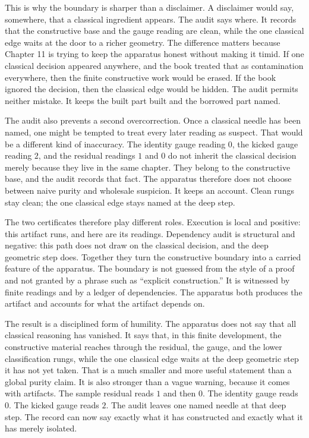 This is why the boundary is sharper than a disclaimer. A disclaimer would say,
somewhere, that a classical ingredient appears. The audit says where. It records
that the constructive base and the gauge reading are clean, while the one classical
edge waits at the door to a richer geometry. The difference matters because Chapter 11 is trying to keep the
apparatus honest without making it timid. If one classical decision appeared
anywhere, and the book treated that as contamination everywhere, then the
finite constructive work would be erased. If the book ignored the decision,
then the classical edge would be hidden. The audit permits neither mistake. It
keeps the built part built and the borrowed part named.

The audit also prevents a second overcorrection. Once a classical needle has
been named, one might be tempted to treat every later reading as suspect. That
would be a different kind of inaccuracy. The identity gauge reading \(0\), the
kicked gauge reading \(2\), and the residual readings \(1\) and \(0\) do not
inherit the classical decision merely because they live in the same chapter. They
belong to the constructive base, and the audit records that fact. The apparatus
therefore does not choose between naive purity and wholesale suspicion. It keeps
an account. Clean rungs stay clean; the one classical edge stays named at the deep
step.

The two certificates therefore play different roles. Execution is local and
positive: this artifact runs, and here are its readings. Dependency audit is
structural and negative: this path does not draw on the classical decision, and
the deep geometric step does. Together they turn the constructive boundary into a carried
feature of the apparatus. The boundary is not guessed from the style of a proof
and not granted by a phrase such as ``explicit construction.'' It is witnessed by
finite readings and by a ledger of dependencies. The apparatus both produces
the artifact and accounts for what the artifact depends on.

The result is a disciplined form of humility. The apparatus does not say that
all classical reasoning has vanished. It says that, in this finite development,
the constructive material reaches through the residual, the gauge, and the
lower classification rungs, while the one classical edge waits at the deep
geometric step it has not yet taken. That
is a much smaller and more useful statement than a global purity claim. It is
also stronger than a vague warning, because it comes with artifacts. The sample
residual reads \(1\) and then \(0\). The identity gauge reads \(0\). The kicked
gauge reads \(2\). The audit leaves one named needle at that deep step. The record can
now say exactly what it has constructed and exactly what it has merely isolated.

